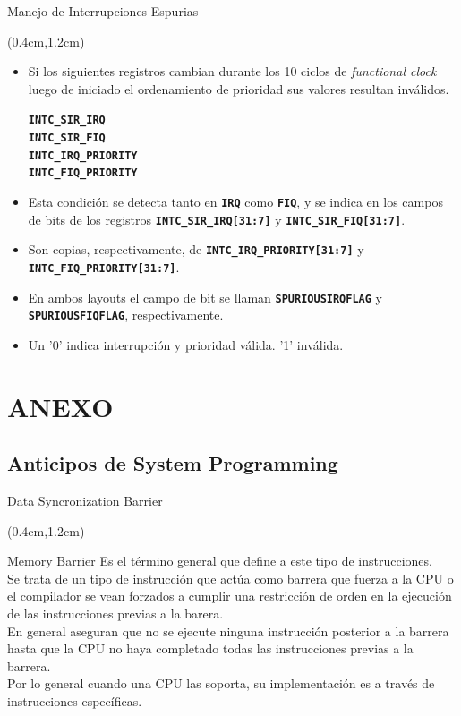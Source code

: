 \documentclass[usenames,table,xcolor={x11names},aspectratio=169]{beamer}
\begin{document}
\begin{frame}[t]{Manejo de Interrupciones Espurias}
 \begin{textblock*}{\textwidth}(0.4cm,1.2cm)
  \begin{itemize}[<+->]\justifying %
   \item Si los siguientes registros cambian durante los 10 ciclos de \textit{functional clock} luego de iniciado el ordenamiento de prioridad sus valores resultan inválidos.
   \begin{description}
    \item[\texttt{\textbf{INTC\_SIR\_IRQ}}] 
    \item[\texttt{\textbf{INTC\_SIR\_FIQ}}] 
    \item[\texttt{\textbf{INTC\_IRQ\_PRIORITY}}] 
    \item[\texttt{\textbf{INTC\_FIQ\_PRIORITY}}] 
   \end{description}
   \item Esta condición se detecta tanto en \texttt{\textbf{IRQ}} como \texttt{\textbf{FIQ}}, y se indica en los campos de bits de los registros \texttt{\textbf{INTC\_SIR\_IRQ[31:7]}} y \texttt{\textbf{INTC\_SIR\_FIQ[31:7]}}.
   \item Son copias, respectivamente, de \texttt{\textbf{INTC\_IRQ\_PRIORITY[31:7]}} y \texttt{\textbf{INTC\_FIQ\_PRIORITY[31:7]}}.
   \item En ambos layouts el campo de bit se llaman \texttt{\textbf{SPURIOUSIRQFLAG}} y \texttt{\textbf{SPURIOUSFIQFLAG}}, respectivamente.
   \item Un '0' indica interrupción y prioridad válida. '1' inválida.
  \end{itemize}
 \end{textblock*}
\end{frame}

\section{ANEXO}
\subsection{Anticipos de System Programming}
\begin{frame}[t]{Data Syncronization Barrier}
 \begin{textblock*}{\textwidth}(0.4cm,1.2cm)
  \begin{block}{Memory Barrier}
   Es el término general que define a este tipo de instrucciones.\\ 
   Se trata de un tipo de instrucción que actúa como barrera que fuerza a la CPU o el compilador se vean forzados a cumplir una restricción de orden en la ejecución de las instrucciones previas a la barera.\\
   En general aseguran que no se ejecute ninguna instrucción posterior a la barrera hasta que la CPU no haya completado todas las instrucciones previas a la barrera.\\
   Por lo general cuando una CPU las soporta, su implementación es a través de instrucciones específicas.
  \end{block}
 \end{textblock*}
\end{frame}
\end{document}
